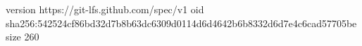 version https://git-lfs.github.com/spec/v1
oid sha256:542524cf86bd32d7b8b63dc6309d0114d6d4642b6b8332d6d7e4c6cad57705be
size 260
